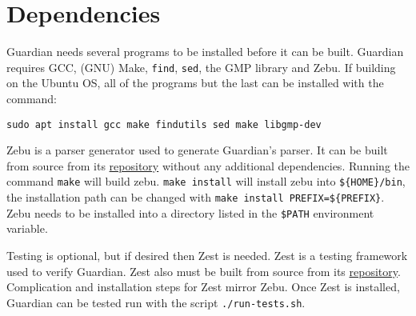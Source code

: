 
\section{Dependencies}
{
	Guardian needs several programs to be installed before it can be built.
	Guardian requires GCC, (GNU) Make, \texttt{find},
	\texttt{sed}, the GMP library and Zebu. If building on the Ubuntu OS, all
	of the programs but the last can be installed with the command:
	
	\begin{lstlisting}
sudo apt install gcc make findutils sed make libgmp-dev
	\end{lstlisting}
	
	Zebu is a parser generator used to generate Guardian's parser. It can be
	built from source from its
	\href{https://github.com/ZanderThannhauser/zebu}{repository} without any
	additional dependencies. Running the command \texttt{make} will build zebu.
	\texttt{make install} will install zebu into \texttt{\$\{HOME\}/bin},
	the installation path can be changed with
	\texttt{make install PREFIX=\$\{PREFIX\}}. Zebu needs to be installed
	into a directory listed in the \texttt{\${PATH}} environment variable.
	
	Testing is optional, but if desired then Zest is needed. Zest is a testing
	framework used to verify Guardian. Zest also must
	be built from source from its
	\href{https://github.com/ZanderThannhauser/zest}{repository}.
	Complication and installation steps for Zest mirror Zebu. Once Zest is
	installed, Guardian can be tested run with the script \texttt{./run-tests.sh}.
}




























